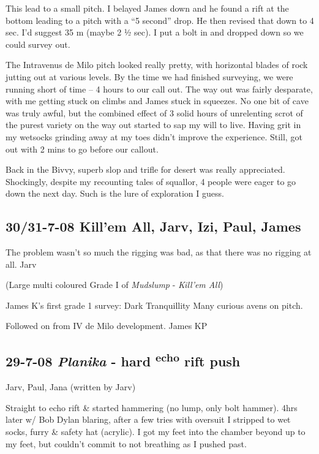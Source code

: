 This lead to a small pitch. I belayed James down and he found a rift at
the bottom leading to a pitch with a ``5 second'' drop. He then revised
that down to 4 sec. I'd suggest 35 m (maybe 2 ½ sec). I put a bolt in
and dropped down so we could survey out.

The Intravenus de Milo pitch looked really pretty, with horizontal
blades of rock jutting out at various levels. By the time we had
finished surveying, we were running short of time -- 4 hours to our call
out. The way out was fairly desparate, with me getting stuck on climbs
and James stuck in squeezes. No one bit of cave was truly awful, but the
combined effect of 3 solid hours of unrelenting scrot of the purest
variety on the way out started to sap my will to live. Having grit in my
wetsocks grinding away at my toes didn't improve the experience. Still,
got out with 2 mins to go before our callout.

Back in the Bivvy, superb slop and trifle for desert was really
appreciated. Shockingly, despite my recounting tales of squallor, 4
people were eager to go down the next day. Such is the lure of
exploration I guess.


\hypertarget{killem-all-jarv-izi-paul-james}{%
\subsection{30/31-7-08 Kill'em All, Jarv, Izi, Paul,
James}\label{killem-all-jarv-izi-paul-james}}

The problem wasn't so much the rigging was bad, as that there was no
rigging at all. Jarv

(Large multi coloured Grade I of \emph{Mudslump} - \emph{Kill'em All})

James K's first grade 1 survey: Dark Tranquillity Many curious avens on
pitch.

Followed on from IV de Milo development. James KP

\hypertarget{planika---hard-echo-rift-push}{%
\subsection{\texorpdfstring{29-7-08 \emph{Planika} - hard
\textsuperscript{echo} rift
push}{29-7-08 Planika - hard echo rift push}}\label{planika---hard-echo-rift-push}}

Jarv, Paul, Jana (written by Jarv)

Straight to echo rift \& started hammering (no lump, only bolt hammer).
4hrs later w/ Bob Dylan blaring, after a few tries with oversuit I
stripped to wet socks, furry \& safety hat (acrylic). I got my feet into
the chamber beyond up to my feet, but couldn't commit to not breathing
as I pushed past.

